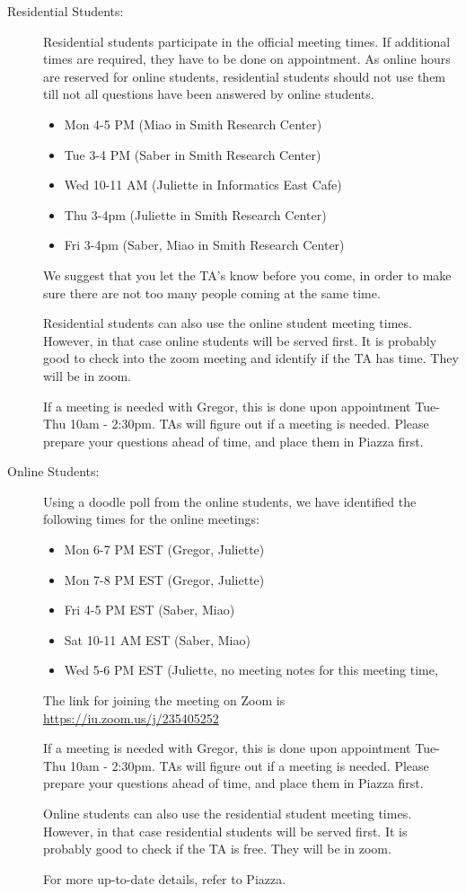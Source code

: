 \begin{description}
\item[Residential Students:]
Residential students participate in the official meeting times. If
additional times are required, they have to be done on appointment. As
online hours are reserved for online students, residential students
should not use them till not all questions have been answered by online
students.

\begin{itemize}

\item
  Mon 4-5 PM (Miao in Smith Research Center)
\item
  Tue 3-4 PM (Saber in Smith Research Center)
\item
  Wed 10-11 AM (Juliette in Informatics East Cafe)
\item
  Thu 3-4pm (Juliette in Smith Research Center)
\item
  Fri 3-4pm (Saber, Miao in Smith Research Center)
\end{itemize}

We suggest that you let the TA's know before you come, in order to make
sure there are not too many people coming at the same time.

Residential students can also use the online student meeting times.
However, in that case online students will be served first. It is
probably good to check into the zoom meeting and identify if the TA has
time. They will be in zoom.

If a meeting is needed with Gregor, this is done upon appointment
Tue-Thu 10am - 2:30pm. TAs will figure out if a meeting is needed.
Please prepare your questions ahead of time, and place them in Piazza
first.
\item[Online Students:]
Using a doodle poll from the online students, we have identified the
following times for the online meetings:

\begin{itemize}

\item
  Mon 6-7 PM EST (Gregor, Juliette)
\item
  Mon 7-8 PM EST (Gregor, Juliette)
\item
  Fri 4-5 PM EST (Saber, Miao)
\item
  Sat 10-11 AM EST (Saber, Miao)
\item
  Wed 5-6 PM EST (Juliette, no meeting notes for this meeting time,
\end{itemize}

The link for joining the meeting on Zoom is
\url{https://iu.zoom.us/j/235405252}

If a meeting is needed with Gregor, this is done upon appointment
Tue-Thu 10am - 2:30pm. TAs will figure out if a meeting is needed.
Please prepare your questions ahead of time, and place them in Piazza
first.

Online students can also use the residential student meeting times.
However, in that case residential students will be served first. It is
probably good to check if the TA is free. They will be in zoom.

For more up-to-date details, refer to Piazza.
\end{description}

